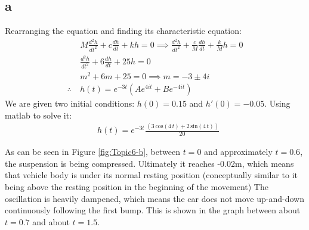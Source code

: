 \subsection{a}
Rearranging the equation and finding its characteristic equation:
\begin{equation} \label{eq:h(t)}
\begin{split}
    &M \frac{d^2h}{dt^2} + c \frac{dh}{dt} + kh = 0 \implies
        \frac{d^2h}{dt^2} + \frac{c}{M} \frac{dh}{dt} + \frac{k}{M}h = 0 \\
    &\frac{d^2h}{dt^2} + 6 \frac{dh}{dt} + 25 h = 0 \\
    & m^2 + 6m + 25 = 0 \implies m = -3 \pm 4i \\
    \therefore \ & h(t) = e^{-3t} \left( Ae^{4it} + Be^{-4it} \right)
\end{split}
\end{equation}
We are given two initial conditions: $h(0) = 0.15$ and $h'(0) = -0.05$. Using matlab to solve it:
\begin{equation*}
\begin{split}
    &h(t) = {e}^{-3t} \frac{\,{\left(3\,\mathrm{cos}\left(4\,t\right)+2\,\mathrm{sin}\left(4\,t\right)\right)}}{20}
\end{split}
\end{equation*}



\pagebreak
As can be seen in Figure \ref{fig:Topic6-b}, between $t = 0$ and approximately $t=0.6$, the suspension is being compressed.
Ultimately it reaches -0.02m, which means that vehicle body is under its normal resting position (conceptually similar to it being above the resting position in the beginning of the movement)
The oscillation is heavily dampened, which means the car does not move up-and-down continuously following the first bump.
This is shown in the graph between about $t=0.7$ and about $t=1.5$.
